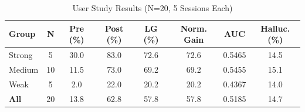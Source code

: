 \begin{table}[htbp]
\centering
\caption{User Study Results (N=20, 5 Sessions Each)}
\label{tab:user_study}
\begin{tabular}{lccccccc}
\toprule
Group & N & Pre (\%) & Post (\%) & LG (\%) & Norm. Gain & AUC & Halluc. (\%) \\
\midrule
Strong & 5 & 30.0 & 83.0 & 72.6 & 72.6 & 0.5465 & 14.5 \\
Medium & 10 & 11.5 & 73.0 & 69.2 & 69.2 & 0.5455 & 15.1 \\
Weak & 5 & 2.0 & 22.0 & 20.2 & 20.2 & 0.4367 & 14.0 \\
\textbf{All} & 20 & 13.8 & 62.8 & 57.8 & 57.8 & 0.5185 & 14.7 \\
\bottomrule
\end{tabular}
\end{table}
